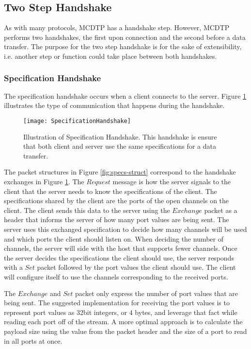 \subsection{Two Step Handshake}

As with many protocols, MCDTP has a handshake step. However, MCDTP performs two handshakes, the first upon connection and the second before a data transfer. The purpose for the two step handshake is for the sake of extensibility, i.e. another step or function could take place between both handshakes.

\subsubsection{Specification Handshake}

The specification handshake occurs when a client connects to the server. Figure \ref{fig:specs} illustrates the type of communication that happens during the handshake.

\begin{figure}[ht]
\centering
\texttt{[image: SpecificationHandshake]}
\caption{Illustration of Specification Handshake. This handshake is ensure that both client and server use the same specifications for a data transfer.}
\label{fig:specs}
\end{figure}

The packet structures in Figure \ref{fig:specs-struct} correspond to the handshake exchanges in Figure \ref{fig:specs}. The $Request$ message is how the server signals to the client that the server needs to know the specifications of the client. The specifications shared by the client are the ports of the open channels on the client. The client sends this data to the server using the $Exchange$ packet as a header that informs the server of how many port values are being sent. The server uses this exchanged specification to decide how many channels will be used and which ports the client should listen on. When deciding the number of channels, the server will side with the host that supports fewer channels. Once the server decides the specifications the client should use, the server responds with a $Set$ packet followed by the port values the client should use. The client will configure itself to use the channels corresponding to the received ports.

The $Exchange$ and $Set$ packet only express the number of port values that are being sent. The suggested implementation for receiving the port values is to represent port values as 32bit integers, or 4 bytes, and leverage that fact while reading each port off of the stream. A more optimal approach is to calculate the payload size using the value from the packet header and the size of a port to read in all ports at once.

